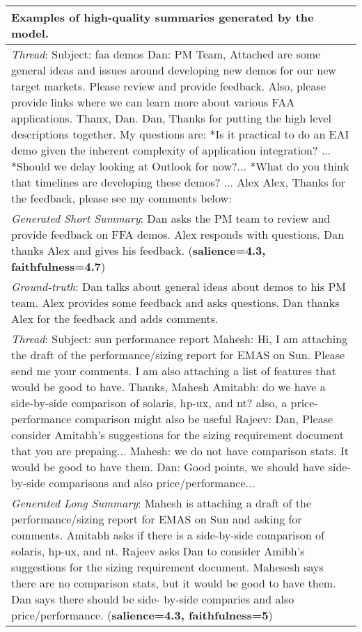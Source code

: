 \begin{table*}
\begin{center}
\small
\begin{tabular}{p{\textwidth}}
\toprule 
\textbf{Examples of high-quality summaries generated by the model.} \\
\midrule
\emph{Thread}: Subject: faa demos  Dan: PM Team, Attached are some general ideas and issues around developing new demos for our new target markets. Please review and provide feedback. Also, please provide links where we can learn more about various FAA applications. Thanx, Dan.  Dan, Thanks for putting the high level descriptions together. My questions are: *Is it practical to do an EAI demo given the inherent complexity of application integration? ... *Should we delay looking at Outlook for now?... *What do you think that timelines are developing these demos? ... Alex  Alex, Thanks for the feedback, please see my comments below:\\
\emph{Generated Short Summary}: Dan asks the PM team to review and provide feedback on FFA demos. Alex responds with questions. Dan thanks Alex and gives his feedback. (\textbf{salience=4.3, faithfulness=4.7}) \\
\emph{Ground-truth}: Dan talks about general ideas about demos to his PM team. Alex provides some feedback and asks questions. Dan thanks Alex for the feedback and adds comments. \\
\midrule
\emph{Thread}: Subject: sun performance report  Mahesh: Hi, I am attaching the draft of the performance/sizing report for EMAS on Sun. Please send me your comments. I am also attaching a list of features that would be good to have. Thanks, Mahesh  Amitabh: do we have a side-by-side comparison of solaris, hp-ux, and nt? also, a price-performance comparison might also be useful   Rajeev: Dan, Please consider Amitabh's suggestions for the sizing requirement document that you are prepaing...  Mahesh: we do not have comparison stats. It would be good to have them.  Dan: Good points, we should have side-by-side comparisons and also price/performance...\\
\emph{Generated Long Summary}: Mahesh is attaching a draft of the performance/sizing report for EMAS on Sun and asking for comments.
Amitabh asks if there is a side-by-side comparison of solaris, hp-ux, and nt.
Rajeev asks Dan to consider Amibh's suggestions for the sizing requirement document.
Mahesesh says there are no comparison stats, but it would be good to have them.
Dan says there should be side- by-side comparies and also price/performance. (\textbf{salience=4.3, faithfulness=5})\\

\end{tabular}
\end{center}
\end{table*}
